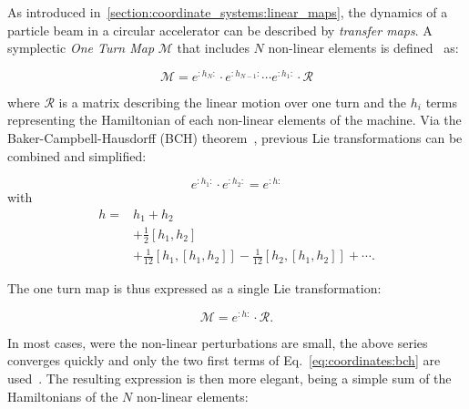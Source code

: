 \subsubsection{}

As introduced in~\ref{section:coordinate_systems:linear_maps}, the dynamics of a particle beam in a circular accelerator can be
described by \textit{transfer maps}. A symplectic \textit{One Turn Map} $\mathcal{M}$ that
includes $N$ non-linear elements is defined~\cite{dragt_overview_2013} as:

\begin{equation}
    \mathcal{M} = e^{:h_N:} \cdot e^{:h_{N-1}:} \cdots e^{:h_1:} \cdot \mathcal{R}
\end{equation}

where $\mathcal{R}$ is a matrix describing the linear motion over one turn and the $h_i$ terms
representing the Hamiltonian of each non-linear elements of the machine.
Via the Baker-Campbell-Hausdorff (BCH) theorem~\cite{forest_beam_1998}, previous Lie transformations
can be combined and simplified:

\begin{equation}
    e^{:h_1:} \cdot e^{:h_2:} = e^{:h:}
\end{equation}
with 
\begin{equation}
    \begin{aligned}
        h =& h_1 + h_2 \\
           & + \frac{1}{2} [h_1, h_2] \\
           & + \frac{1}{12} [h_1, [h_1, h_2]] - \frac{1}{12} [h_2, [h_1, h_2]] + \cdots.
    \end{aligned}
    \label{eq:coordinates:bch}
\end{equation}

The one turn map is thus expressed as a single Lie transformation:

\begin{equation}
    \mathcal{M} = e^{:h:} \cdot \mathcal{R}.
   \label{eq:coordinate_systems:non_linear_map}
\end{equation}

In most cases, were the non-linear perturbations are small, the above series converges quickly
and only the two first terms of Eq.~\eqref{eq:coordinates:bch} are
used~\cite{carlier_nonlinear_2020-1}. The resulting expression is then more elegant, being a simple
sum of the Hamiltonians of the $N$ non-linear elements:

